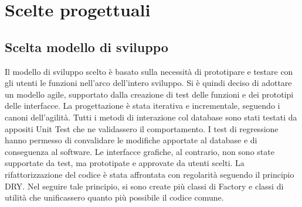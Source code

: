 \chapter{Scelte progettuali}\label{chap:ScelteProgettuali}
\section{Scelta modello di sviluppo}
Il modello di sviluppo scelto è basato sulla necessità di prototipare e testare
con gli utenti le funzioni nell'arco dell'intero sviluppo.
Si è quindi deciso di adottare un modello agile,
supportato dalla creazione di test delle funzioni e dei prototipi delle interfacce.
La progettazione è stata iterativa e incrementale, seguendo i canoni dell'agilità.
Tutti i metodi di interazione col database sono stati testati da appositi Unit Test
che ne validassero il comportamento.
I test di regressione hanno permesso di convalidare le modifiche apportate al database e di
conseguenza al software.
Le interfacce grafiche, al contrario, non sono state supportate da test, ma prototipate e
approvate da utenti scelti.
La rifattorizzazione del codice è stata affrontata con regolarità seguendo il principio \ac{DRY}.
Nel seguire tale principio, si sono create più classi di Factory e classi di utilità
che unificassero quanto più possibile il codice comune.

